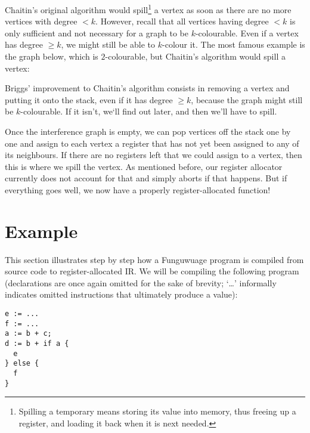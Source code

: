 \documentclass[12pt]{report}
\newcommand{\langname}{Funguwuage}
\begin{document}
Chaitin’s original algorithm would spill\footnote{Spilling a temporary means storing its value into memory, thus freeing up a register, and
loading it back when it is next needed.} a vertex as soon as there are no more vertices with degree $< k$. However, recall that all
vertices having degree $< k$ is only sufficient and not necessary for a graph to be $k$-colourable. Even if a vertex has degree $\geq k$, we
might still be able to $k$-colour it. The most famous example is the graph below, which is $2$-colourable, but Chaitin’s algorithm would
spill a vertex:
\begin{center}
\end{center}

\noindent Briggs’ improvement to Chaitin’s algorithm consists in removing a vertex and putting it onto the stack, even if it has degree
$\geq k$, because the graph might still be $k$-colourable. If it isn’t, we‘ll find out later, and then we’ll have to spill.

Once the interference graph is empty, we can pop vertices off the stack one by one and assign to each vertex a register that has not yet
been assigned to any of its neighbours. If there are no registers left that we could assign to a vertex, then this is where we spill the
vertex. As mentioned before, our register allocator currently does not account for that and simply aborts if that happens. But if everything
goes well, we now have a properly register-allocated function!

\section{Example}
This section illustrates step by step how a \langname{} program is compiled from source code to register-allocated IR. We will be compiling
the following program (declarations are once again omitted for the sake of brevity; ‘\ldots’ informally indicates omitted instructions that
ultimately produce a value):
\begin{Verbatim}
e := ...
f := ...
a := b + c;
d := b + if a {
  e
} else {
  f
}
\end{Verbatim}
\end{document}
